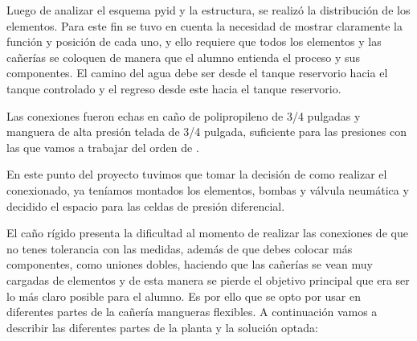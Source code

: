 Luego de analizar el esquema \gls{pyid} y  la estructura, se realizó la distribución de los elementos.
Para este fin se tuvo en cuenta la necesidad de mostrar claramente la función y posición de cada uno,
y ello requiere que todos los elementos y las cañerías se coloquen de manera que el alumno entienda
el proceso y sus componentes. El camino del  agua debe ser desde el tanque reservorio hacia el tanque
controlado y el regreso desde este hacia el tanque reservorio.

Las conexiones fueron echas en caño de polipropileno de 3/4 pulgadas y manguera de alta presión telada
de 3/4 pulgada, suficiente para las presiones con las que vamos a trabajar del orden de . 

En este punto del proyecto tuvimos que tomar la decisión de como realizar el conexionado, ya teníamos 
montados los elementos, bombas y válvula neumática y decidido el espacio para las celdas de presión
diferencial.

El caño rígido presenta la dificultad al momento de realizar las conexiones de que no tenes tolerancia
con las medidas, además de que debes colocar más componentes, como uniones dobles, haciendo que las
cañerías se vean muy cargadas de elementos y de esta manera se pierde el objetivo principal que era 
ser lo  más claro posible para el alumno. Es por ello que se opto por usar en diferentes partes de 
la cañería mangueras flexibles.
A continuación vamos a describir las diferentes partes de la planta y la solución optada:


